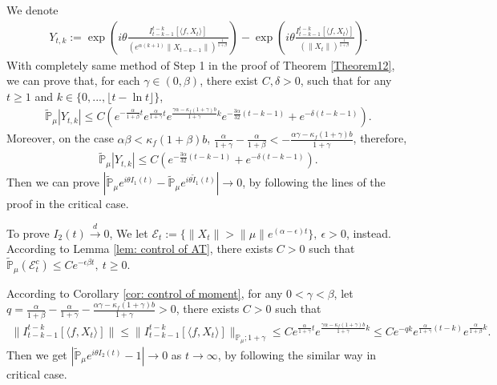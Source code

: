 \documentclass[12pt,oneside,english]{amsart}
\theoremstyle{plain}
\theoremstyle{definition}
\numberwithin{equation}{section}
\begin{document}
    We denote
    \begin{align*}
        Y_{t,k}:=\exp\left(i\theta\frac{I_{t-k-1}^{t-k}[\langle f ,X_t\rangle]}{( e^{\alpha(k+1)}\|X_{t-k-1}\|)^{\frac{1}{1+\beta}}}\right)-\exp\left(i\theta\frac{I_{t-k-1}^{t-k}[\langle f ,X_t\rangle]}{\left(\|X_t\|\right)^{\frac{1}{1+\beta}}}\right).
    \end{align*}
With completely same method of Step 1 in the proof of Theorem \ref{Theorem12}, we can prove that, for each $\gamma\in (0,\beta)$, there exist $C,\delta>0$, such that for any $t\geq1$ and $k\in \{0,...,\lfloor t-\ln t\rfloor\}$,
\begin{align*}
    \mathbb{\tilde{P}}_{\mu}|Y_{t,k}|\leq C( e^{-\frac{\alpha}{1+\beta}t}e^{\frac{\alpha}{1+\gamma}t}e^{\frac{\gamma \alpha-\kappa_f(1+\gamma)b}{1+\gamma}k}e^{-\frac{3\alpha}{32}(t-k-1)}+ e^{-\delta(t-k-1)}).
\end{align*}
Moreover, on the case $\alpha\beta<\kappa_f(1+\beta)b$,  $\frac{\alpha}{1+\gamma}-\frac{\alpha}{1+\beta}< - \frac{\alpha\gamma-\kappa_f(1+\gamma)b}{1+\gamma}$, therefore,
\begin{align}
    \mathbb{\tilde{P}}_{\mu}|Y_{t,k}|\leq C (e^{-\frac{3\alpha}{32}(t-k-1)}+e^{-\delta(t-k-1)}).
\end{align}
Then we can prove $\left|\mathbb{\tilde{P}}_{\mu}e^{i\theta I_1(t)}-\mathbb{\tilde{P}}_{\mu}e^{i\theta\tilde{I}_1(t)}\right|\rightarrow 0$, by following the lines of the proof in the critical case.

To prove $I_2(t)\xrightarrow{d} 0$, We let $\mathcal{E}_t:=\{\|X_t\|>\|\mu\|e^{(\alpha-\epsilon )t}\},~\epsilon>0$, instead. According to Lemma \ref{lem: control of AT}, there exists
$C>0$ such that  $\mathbb{\tilde{P}}_{\mu}(\mathcal{E}_t^c)\leq C e^{-\epsilon \beta t},~t\geq 0$.

According to Corollary \ref{cor: control of moment}, for any $0< \gamma <\beta$, let $q=\frac{\alpha}{1+\beta}-\frac{\alpha}{1+\gamma} - \frac{\alpha\gamma-\kappa_f(1+\gamma)b}{1+\gamma}>0$, there exists $C>0$ such that
\begin{align}
    \|I_{t-k-1}^{t-k}[\langle f ,X_t\rangle]\|\leq \|I_{t-k-1}^{t-k}[\langle f ,X_t\rangle]\|_{\mathbb{P}_{\mu};1+\gamma}\leq C e^{\frac{\alpha}{1+\gamma}t}e^{\frac{\gamma \alpha-\kappa_f(1+\gamma)b}{1+\gamma}k}\leq C e^{-qk}e^{\frac{\alpha}{1+\gamma}(t-k)}e^{\frac{\alpha}{1+\beta}k}.
\end{align}
Then we get $  \left|\mathbb{\tilde{P}}_{\mu}e^{i\theta I_2(t)}-1\right|\rightarrow 0$ as $ t\rightarrow \infty$, by following the similar way in critical case.
\end{document}
